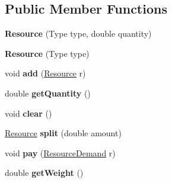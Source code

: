 \subsection*{Public Member Functions}
\begin{DoxyCompactItemize}
\item 
{\bfseries Resource} (Type type, double quantity)\hypertarget{classuniverse_1_1_resource_a77163f908b8d0572a9606dc97ed10b03}{}\label{classuniverse_1_1_resource_a77163f908b8d0572a9606dc97ed10b03}

\item 
{\bfseries Resource} (Type type)\hypertarget{classuniverse_1_1_resource_a9a3fd088bb233ce476f47d8416a32d07}{}\label{classuniverse_1_1_resource_a9a3fd088bb233ce476f47d8416a32d07}

\item 
void {\bfseries add} (\hyperlink{classuniverse_1_1_resource}{Resource} r)\hypertarget{classuniverse_1_1_resource_a1bfc40d650f3af151927b41eba2c0287}{}\label{classuniverse_1_1_resource_a1bfc40d650f3af151927b41eba2c0287}

\item 
double {\bfseries get\+Quantity} ()\hypertarget{classuniverse_1_1_resource_aad810c78f9add4e321748c9d30cf80d8}{}\label{classuniverse_1_1_resource_aad810c78f9add4e321748c9d30cf80d8}

\item 
void {\bfseries clear} ()\hypertarget{classuniverse_1_1_resource_a8579612440fea41492509796b36c344f}{}\label{classuniverse_1_1_resource_a8579612440fea41492509796b36c344f}

\item 
\hyperlink{classuniverse_1_1_resource}{Resource} {\bfseries split} (double amount)\hypertarget{classuniverse_1_1_resource_a2cf7f7c53a2ca5aba3e727abbd8d316a}{}\label{classuniverse_1_1_resource_a2cf7f7c53a2ca5aba3e727abbd8d316a}

\item 
void {\bfseries pay} (\hyperlink{classuniverse_1_1_resource_demand}{Resource\+Demand} r)\hypertarget{classuniverse_1_1_resource_a3f36659adf329d6e1d7d1f1a7719b5ad}{}\label{classuniverse_1_1_resource_a3f36659adf329d6e1d7d1f1a7719b5ad}

\item 
double {\bfseries get\+Weight} ()\hypertarget{classuniverse_1_1_resource_a8dc0f241f22bfcb01e547b4ca39f1314}{}\label{classuniverse_1_1_resource_a8dc0f241f22bfcb01e547b4ca39f1314}

\end{DoxyCompactItemize}
